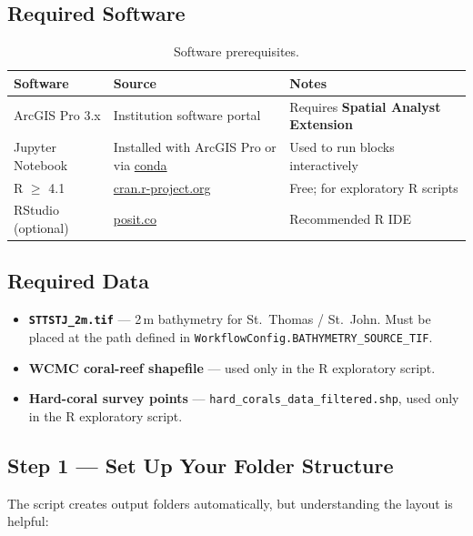 \documentclass[11pt, a4paper]{article}
\begin{document}
\subsection{Required Software}

\begin{table}[h]
\centering
\caption{Software prerequisites.}
\begin{tabularx}{\linewidth}{L{3.5cm}L{5cm}X}
\toprule
\textbf{Software} & \textbf{Source} & \textbf{Notes} \\
\midrule
ArcGIS Pro 3.x  & Institution software portal  & Requires \textbf{Spatial Analyst Extension} \\
Jupyter Notebook & Installed with ArcGIS Pro or via \href{https://docs.conda.io}{conda} & Used to run blocks interactively \\
R $\geq$ 4.1    & \href{https://cran.r-project.org/}{cran.r-project.org} & Free; for exploratory R scripts \\
RStudio (optional) & \href{https://posit.co/}{posit.co} & Recommended R IDE \\
\bottomrule
\end{tabularx}
\end{table}

\subsection{Required Data}

\begin{itemize}[noitemsep]
  \item \textbf{\texttt{STTSTJ\_2m.tif}} — 2\,m bathymetry for St.\ Thomas /
        St.\ John.  Must be placed at the path defined in
        \texttt{WorkflowConfig.BATHYMETRY\_SOURCE\_TIF}.
  \item \textbf{WCMC coral-reef shapefile} — used only in the R exploratory
        script.
  \item \textbf{Hard-coral survey points} — \texttt{hard\_corals\_data\_filtered.shp},
        used only in the R exploratory script.
\end{itemize}

\subsection{Step 1 — Set Up Your Folder Structure}

The script creates output folders automatically, but understanding the layout
is helpful:
\end{document}
